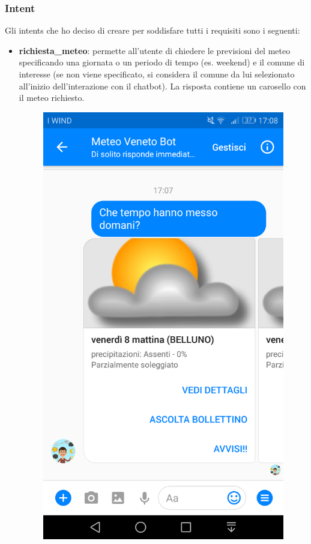 \subsubsection{Intent}
Gli intents che ho deciso di creare per soddisfare tutti i requisiti sono i seguenti:
\begin{itemize}
	\item \textbf{richiesta\_meteo}: permette all'utente di chiedere le previsioni del meteo specificando una giornata o un periodo di tempo (es. weekend) e il comune di interesse (se non viene specificato, si considera il comune da lui selezionato all'inizio dell'interazione con il \gls{chatbot}). La risposta contiene un carosello con il meteo richiesto.
	\begin{figure}[h]
		\centering
		\includegraphics[scale=0.12]{../Immagini/richiesta_meteo.png}

\end{figure}
\end{itemize}
